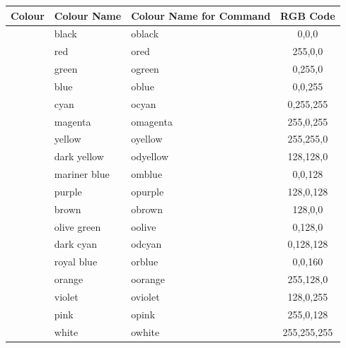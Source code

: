 \documentclass[
	a4paper,
	parskip=half,
    pagesize=auto,      		%
    listof=totoc,   		%
    bibliography=totoc,
	11pt
]{scrartcl}
\begin{document}
\begin{table}[H]
\centering
\begin{tabular}{|l|l|l|c|}
\hline
Colour                   & Colour Name   & Colour Name for Command & RGB Code \\ \hline \hline
\cellcolor[RGB]{0,0,0} & black         & oblack                  & 0,0,0    \\ \hline
\cellcolor[RGB]{255,0,0} & red           & ored                    & 255,0,0    \\ \hline
\cellcolor[RGB]{0,255,0} & green         & ogreen                  & 0,255,0    \\ \hline
\cellcolor[RGB]{0,0,255} & blue          & oblue                   & 0,0,255    \\ \hline
\cellcolor[RGB]{0,255,255} & cyan          & ocyan                   & 0,255,255    \\ \hline
\cellcolor[RGB]{255,0,255} & magenta       & omagenta                & 255,0,255    \\ \hline
\cellcolor[RGB]{255,255,0} & yellow        & oyellow                 & 255,255,0    \\ \hline
\cellcolor[RGB]{128,128,0} & dark yellow   & odyellow                & 128,128,0    \\ \hline
\cellcolor[RGB]{0,0,128} & mariner blue  & omblue                  & 0,0,128    \\ \hline
\cellcolor[RGB]{128,0,128} & purple        & opurple                 & 128,0,128    \\ \hline
\cellcolor[RGB]{128,0,0} & brown         & obrown                  & 128,0,0    \\ \hline
\cellcolor[RGB]{0,128,0} & olive green   & oolive                  & 0,128,0    \\ \hline
\cellcolor[RGB]{0,128,128} & dark cyan     & odcyan                  & 0,128,128    \\ \hline
\cellcolor[RGB]{0,0,160} & royal blue    & orblue                  & 0,0,160    \\ \hline
\cellcolor[RGB]{255,128,0} & orange        & oorange                 & 255,128,0   \\ \hline
\cellcolor[RGB]{128,0,255} & violet        & oviolet                 & 128,0,255    \\ \hline
\cellcolor[RGB]{255,0,128} & pink          & opink                   & 255,0,128    \\ \hline
\cellcolor[RGB]{255,255,255} & white         & owhite                  & 255,255,255    \\ \hline

\end{tabular}
\end{table}
\end{document}
